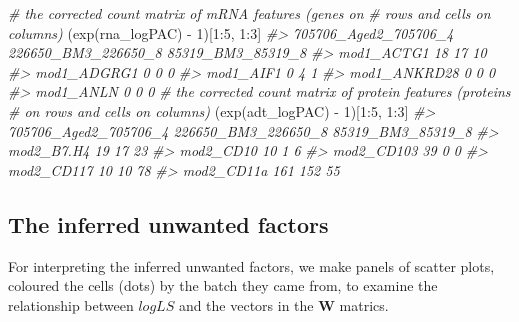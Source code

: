 \documentclass[]{article}
\newcommand{\hlnum}[1]{\textcolor[rgb]{0.816,0.125,0.439}{#1}}%
\newcommand{\hlstr}[1]{\textcolor[rgb]{0.251,0.627,0.251}{#1}}%
\newcommand{\hlcom}[1]{\textcolor[rgb]{0.502,0.502,0.502}{\textit{#1}}}%
\newcommand{\hlstd}[1]{\textcolor[rgb]{0.251,0.251,0.251}{#1}}%
\newenvironment{Shaded}{\begin{myshaded}}{\end{myshaded}}
\newcommand{\DecValTok}[1]{\hlnum{#1}}
\newcommand{\SpecialCharTok}[1]{\hlstr{#1}}
\newcommand{\CommentTok}[1]{\hlcom{#1}}
\newcommand{\FunctionTok}[1]{\hlstd{#1}}
\newcommand{\NormalTok}[1]{\hlstd{#1}}
\begin{document}
\begin{Shaded}
\begin{Highlighting}[]
\CommentTok{\# the corrected count matrix of mRNA features (genes on}
\CommentTok{\# rows and cells on columns)}
\NormalTok{(}\FunctionTok{exp}\NormalTok{(rna\_logPAC) }\SpecialCharTok{{-}} \DecValTok{1}\NormalTok{)[}\DecValTok{1}\SpecialCharTok{:}\DecValTok{5}\NormalTok{, }\DecValTok{1}\SpecialCharTok{:}\DecValTok{3}\NormalTok{]}
\CommentTok{\#\textgreater{}              705706\_Aged2\_705706\_4 226650\_BM3\_226650\_8 85319\_BM3\_85319\_8}
\CommentTok{\#\textgreater{} mod1\_ACTG1                      18                  17                10}
\CommentTok{\#\textgreater{} mod1\_ADGRG1                      0                   0                 0}
\CommentTok{\#\textgreater{} mod1\_AIF1                        0                   4                 1}
\CommentTok{\#\textgreater{} mod1\_ANKRD28                     0                   0                 0}
\CommentTok{\#\textgreater{} mod1\_ANLN                        0                   0                 0}
\CommentTok{\# the corrected count matrix of protein features (proteins}
\CommentTok{\# on rows and cells on columns)}
\NormalTok{(}\FunctionTok{exp}\NormalTok{(adt\_logPAC) }\SpecialCharTok{{-}} \DecValTok{1}\NormalTok{)[}\DecValTok{1}\SpecialCharTok{:}\DecValTok{5}\NormalTok{, }\DecValTok{1}\SpecialCharTok{:}\DecValTok{3}\NormalTok{]}
\CommentTok{\#\textgreater{}            705706\_Aged2\_705706\_4 226650\_BM3\_226650\_8 85319\_BM3\_85319\_8}
\CommentTok{\#\textgreater{} mod2\_B7.H4                    19                  17                23}
\CommentTok{\#\textgreater{} mod2\_CD10                     10                   1                 6}
\CommentTok{\#\textgreater{} mod2\_CD103                    39                   0                 0}
\CommentTok{\#\textgreater{} mod2\_CD117                    10                  10                78}
\CommentTok{\#\textgreater{} mod2\_CD11a                   161                 152                55}
\end{Highlighting}
\end{Shaded}

\subsection{The inferred unwanted factors}\label{the-inferred-unwanted-factors}

For interpreting the inferred unwanted factors, we make panels of scatter plots, coloured the cells (dots) by the batch they came from, to examine the relationship between \(logLS\) and the vectors in the \(\boldsymbol W\) matrics.
\end{document}
